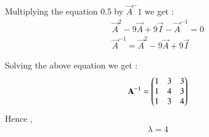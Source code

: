 \documentclass[journal]{IEEEtran}
\begin{document}
Multiplying the equation 0.5 by $\vec{A}^-1$ we get :
\begin{align}
  \vec{A}^2 -9\vec{A} +9\vec{I} - \vec{A}^{-1} = 0 \\
  \vec{A}^{-1} = \vec{A}^2 -9\vec{A} +9\vec{I}
\end{align}

Solving the above equation we get :
\begin{align}
   \mathbf{A}^{-1} = \begin{pmatrix}1&3&3\\1&4&3\\1&3&4\end{pmatrix}
\end{align}
Hence ,
\begin{align}
    \lambda = 4
\end{align}
\end{document}
